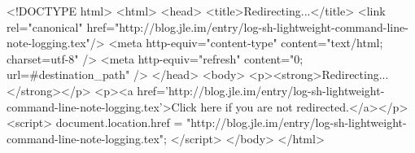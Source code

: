 <!DOCTYPE html>
<html>
<head>
<title>Redirecting...</title>
<link rel="canonical" href="http://blog.jle.im/entry/log-sh-lightweight-command-line-note-logging.tex"/>
<meta http-equiv="content-type" content="text/html; charset=utf-8" />
<meta http-equiv="refresh" content="0; url=#{destination_path}" />
</head>
<body>
  <p><strong>Redirecting...</strong></p>
  <p><a href='http://blog.jle.im/entry/log-sh-lightweight-command-line-note-logging.tex'>Click here if you are not redirected.</a></p>
  <script>
    document.location.href = "http://blog.jle.im/entry/log-sh-lightweight-command-line-note-logging.tex";
  </script>
</body>
</html>

